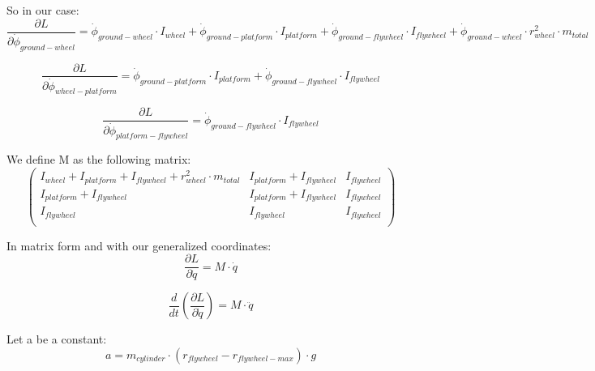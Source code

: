 So in our case:
\begin{equation}
	\frac{\partial L}{\partial \dot{\phi}_{ground-wheel}}=
	\dot{\phi}_{ground-wheel} \cdot I_{wheel}
	+ \dot{\phi}_{ground-platform} \cdot I_{platform}
	+ \dot{\phi}_{ground-flywheel}\cdot I_{flywheel}
	+ \dot{\phi}_{ground-wheel}\cdot r_{wheel}^2\cdot m_{total}
\end{equation}

\begin{equation}
	\frac{\partial L}{\partial \dot{\phi}_{wheel-platform}}=
	\dot{\phi}_{ground-platform} \cdot I_{platform}
	+ \dot{\phi}_{ground-flywheel}\cdot I_{flywheel}
\end{equation}

\begin{equation}
	\frac{\partial L}{\partial \dot{\phi}_{platform-flywheel}}=
	\dot{\phi}_{ground-flywheel}\cdot I_{flywheel}
\end{equation}

We define M as the following matrix:
\begin{equation}
	\begin{pmatrix}
		I_{wheel} + I_{platform} + I_{flywheel} + r_{wheel}^2 \cdot m_{total} &
		I_{platform} + I_{flywheel}                                           &
		I_{flywheel}                                                            \\
		I_{platform} + I_{flywheel}                                           &
		I_{platform} + I_{flywheel}                                           &
		I_{flywheel}                                                            \\
		I_{flywheel}                                                          &
		I_{flywheel}                                                          &
		I_{flywheel}                                                            \\
	\end{pmatrix}
\end{equation}

In matrix form and with our generalized coordinates:
\begin{equation}
	\frac{\partial L}{\partial \dot{q}} =
	M \cdot \dot{q}
\end{equation}

\begin{equation}
	\frac{d}{dt}(\frac{\partial L}{\partial \dot{q}}) = 	M \cdot \ddot{q}
\end{equation}

Let a be a constant:
\begin{equation}
	a = m_{cylinder}\cdot (r_{flywheel}-r_{flywheel-max}) \cdot g
\end{equation}

